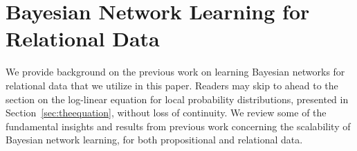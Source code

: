 \documentclass[runningheads,a4paper]{llncs}
\begin{document}
\section{Bayesian Network Learning for Relational Data} \label{sec:bnlearning}
We provide background on the previous work on learning Bayesian networks for relational data that we utilize in this paper. Readers may skip to ahead to the section on the log-linear equation for local probability distributions, presented in Section~\ref{sec:theequation}, without loss of continuity.
%
%
We review some of the fundamental insights and results from previous work concerning the scalability of Bayesian network learning, for both propositional and relational data. 
\end{document}
